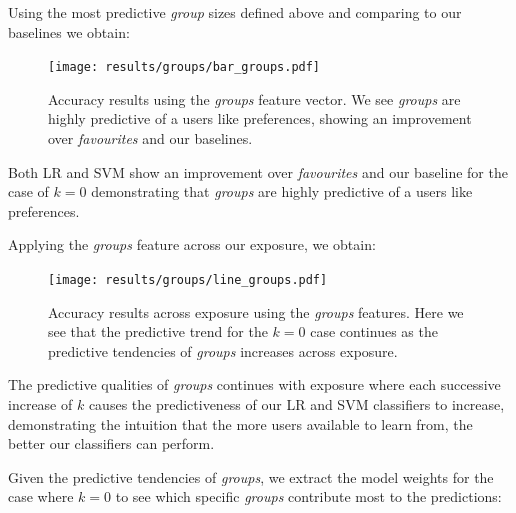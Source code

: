 Using the most predictive \emph{group} sizes defined above and comparing to our baselines we obtain:

\begin{figure}[h]
	\begin{center}
		\texttt{[image: results/groups/bar\_groups.pdf]}
		\caption{Accuracy results using the \emph{groups} feature vector. We see \emph{groups} are highly predictive of a users like preferences, showing an improvement over \emph{favourites} and our baselines.}
	\end{center}
\end{figure}

Both LR and SVM show an improvement over \emph{favourites} and our baseline for the case of $k=0$ demonstrating that \emph{groups} are highly predictive of a users like preferences.

Applying the \emph{groups} feature across our exposure, we obtain:

\begin{figure}[h]
	\begin{center}
		\texttt{[image: results/groups/line\_groups.pdf]}
		\caption{Accuracy results across exposure using the \emph{groups} features. Here we see that the predictive trend for the $k=0$
				 case continues as the predictive tendencies of \emph{groups} increases across exposure.}
	\end{center}
\end{figure}

\clearpage

The predictive qualities of \emph{groups} continues with exposure where each successive increase of $k$ causes the predictiveness of our LR and SVM 
classifiers to increase, demonstrating the intuition that the more users available to learn from, the better our classifiers can perform.

Given the predictive tendencies of \emph{groups}, we extract the model weights for the case where $k=0$ to see which specific \emph{groups} 
contribute most to the predictions:

